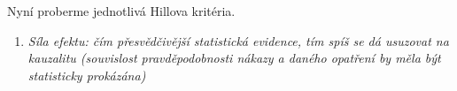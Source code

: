 Nyní proberme jednotlivá Hillova kritéria.
\begin{enumerate}
\item \emph{Síla efektu: čím přesvědčivější statistická evidence, tím spíš
se dá usuzovat na kauzalitu (souvislost pravděpodobnosti nákazy a
daného opatření by měla být statisticky prokázána)}
\end{enumerate}
